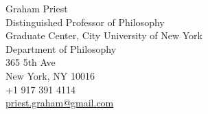 Graham Priest
\\Distinguished Professor of Philosophy
\\Graduate Center, City University of New York 
\\Department of Philosophy 
\\365 5th Ave
\\New York, NY 10016
\\+1 917 391 4114
\\ \href{mailto:priest.graham@gmail.com }{priest.graham@gmail.com}
